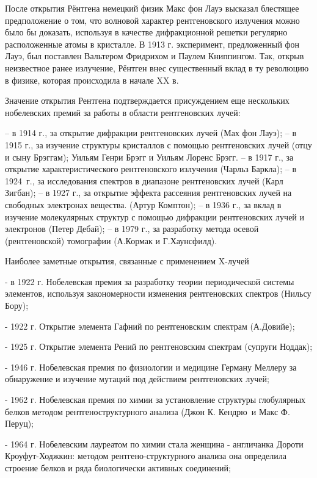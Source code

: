 \documentclass[a4paper,14pt, openany, twoside, draft]{extbook} %
\begin{document}
После открытия Рёнтгена немецкий физик Макс фон Лауэ высказал блестящее предположение о том, что волновой характер рентгеновского излучения можно было бы доказать, используя в качестве дифракционной решетки регулярно расположенные атомы в кристалле. В 1913 г. эксперимент, предложенный фон Лауэ, был поставлен Вальтером Фридрихом и Паулем Книппингом. Так, открыв неизвестное ранее излучение, Рёнтген внес существенный вклад в ту революцию в физике, которая происходила в начале XX в.

Значение открытия Рентгена подтверждается присуждением еще нескольких нобелевских премий за работы в области рентгеновских лучей:

– в 1914 г., за открытие дифракции рентгеновских лучей (Мах фон Лауэ);  – в 1915 г., за изучение структуры кристаллов с помощью рентгеновских лучей (отцу и сыну Брэггам); Уильям Генри Брэгг и Уильям Лоренс Брэгг. – в 1917 г., за открытие характеристического рентгеновского излучения (Чарльз Баркла);  – в 1924~г., за исследования спектров в диапазоне рентгеновских лучей (Карл Зигбан); – в 1927 г., за открытие эффекта рассеяния рентгеновских лучей на свободных электронах вещества. (Артур Комптон);  – в 1936 г., за вклад в изучение молекулярных структур с помощью дифракции рентгеновских лучей и электронов (Петер Дебай);  – в 1979 г., за разработку метода осевой (рентгеновской) томографии (А.Кормак и Г.Хаунсфилд).

Наиболее заметные открытия, связанные с применением X-лучей

{}- в 1922 г. Нобелевская премия за разработку теории периодической системы элементов, используя закономерности изменения рентгеновских спектров (Нильсу Бору);

{}- 1922 г. Открытие элемента Гафний по рентгеновским спектрам (А.Довийе);

{}- 1925 г. Открытие элемента Рений по рентгеновским спектрам (супруги Ноддак);

{}- 1946 г. Нобелевская премия по физиологии и медицине Герману Меллеру за обнаружение и изучение мутаций под действием рентгеновских лучей;

{}- 1962 г. Нобелевская премия по химии за установление структуры глобулярных белков методом рентгеноструктурного анализа (Джон К. Кендрю~и Макс Ф. Перуц);~

{}- 1964 г. Нобелевским лауреатом по химии стала женщина - англичанка Дороти Кроуфут-Ходжкин: методом рентгено-структурного анализа она определила строение белков и ряда биологически активных соединений;
\end{document}
